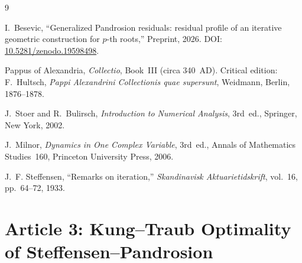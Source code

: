 \documentclass[10pt,a4paper,oneside]{book}
\theoremstyle{definition}
\theoremstyle{remark}
\begin{document}
\begin{thebibliography}{9}

I.~Besevic,
``Generalized Pandrosion residuals: residual profile of an iterative geometric construction for $p$-th roots,''
Preprint, 2026.
DOI: \href{https://doi.org/10.5281/zenodo.19598498}{10.5281/zenodo.19598498}.

Pappus of Alexandria,
\textit{Collectio}, Book~III (circa 340~AD).
Critical edition: F.~Hultsch, \textit{Pappi Alexandrini Collectionis quae supersunt},
Weidmann, Berlin, 1876--1878.

J.~Stoer and R.~Bulirsch,
\textit{Introduction to Numerical Analysis},
3rd~ed., Springer, New York, 2002.

J.~Milnor,
\textit{Dynamics in One Complex Variable},
3rd~ed., Annals of Mathematics Studies~160, Princeton University Press, 2006.

J.~F. Steffensen,
``Remarks on iteration,''
\textit{Skandinavisk Aktuarietidskrift}, vol.~16, pp.~64--72, 1933.

\end{thebibliography}





\chapter{Article 3: Kung--Traub Optimality of Steffensen--Pandrosion}
\graphicspath{{../figures/}}
\end{document}
